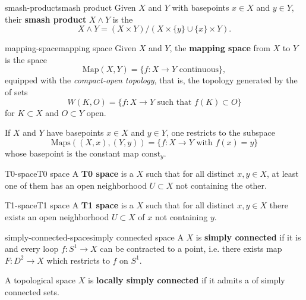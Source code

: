 \begin{topic}{smash-product}{smash product}
    Given  $X$ and $Y$ with basepoints $x \in X$ and $y \in Y$, their \textbf{smash product} $X \wedge Y$ is the 
    \[ X \wedge Y = (X \times Y) / (X \times \{ y \} \cup \{ x \} \times Y) . \]
\end{topic}

\begin{topic}{mapping-space}{mapping space}
    Given  $X$ and $Y$, the \textbf{mapping space} from $X$ to $Y$ is the space
    \[ \text{Map}(X, Y) = \{ f : X \to Y \text{ continuous} \} , \]
    equipped with the \textit{compact-open topology}, that is, the topology generated by the  of sets
    \[ W(K, O) = \{ f : X \to Y \text{ such that } f(K) \subset O \} \]
    for $K \subset X$  and $O \subset Y$ open.
    
    If $X$ and $Y$ have basepoints $x \in X$ and $y \in Y$, one restricts to the subspace
    \[ \text{Maps}((X, x), (Y, y)) = \{ f : X \to Y \text{ with } f(x) = y \} \]
    whose basepoint is the constant map $\text{const}_y$.
\end{topic}

\begin{topic}{T0-space}{T0 space}
    A \textbf{T0 space} is a  $X$ such that for all distinct $x, y \in X$, at least one of them has an open neighborhood $U \subset X$ not containing the other.
\end{topic}

\begin{topic}{T1-space}{T1 space}
    A \textbf{T1 space} is a  $X$ such that for all distinct $x, y \in X$ there exists an open neighborhood $U \subset X$ of $x$ not containing $y$.
\end{topic}

\begin{topic}{simply-connected-space}{simply connected space}
    A  $X$ is \textbf{simply connected} if it is  and every loop $f : S^1 \to X$ can be contracted to a point, i.e. there exists map $F : D^2 \to X$ which restricts to $f$ on $S^1$.
    
    A topological space $X$ is \textbf{locally simply connected} if it admits a  of simply connected sets.
\end{topic}

